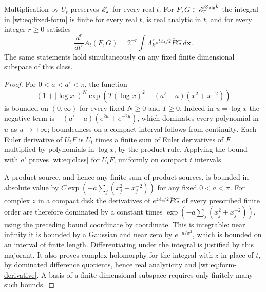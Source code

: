 \begin{lemma}
\label{wt:lem:domination}
Multiplication by $U_t$ preserves $\mathscr E_\pi$ for every real $t$.
For $F,G\in\mathscr E_\pi^{\otimes_{\mathrm{alg}} k}$ the integral
in \eqref{wt:eq:fixed-form} is finite for every real $t$, is
real analytic in $t$, and for every integer $r\geq0$ satisfies
\begin{equation}\label{wt:eq:form-derivative}
 \frac{d^r}{dt^r}A_t(F,G)
 =2^{-r}\int\Lambda_k^r e^{t\Lambda_k/2}\overline F G\,d\mathbf x.
\end{equation}
The same statements hold simultaneously on any fixed finite
dimensional subspace of this class.
\end{lemma}

\begin{proof}
For $0<a<a'<\pi$, the function
\[
 (1+|\log x|)^N
 \exp\!\left(T(\log x)^2-(a'-a)(x^2+x^{-2})\right)
\]
is bounded on $(0,\infty)$ for every fixed $N\geq0$ and $T\geq0$.
Indeed in $u=\log x$ the negative term is
$-(a'-a)(e^{2u}+e^{-2u})$, which dominates every polynomial
in $u$ as $u\to\pm\infty$; boundedness on a compact interval
follows from continuity.  Each Euler derivative of $U_tF$ is
$U_t$ times a finite sum of Euler derivatives of $F$ multiplied
by polynomials in $\log x$, by the product rule.  Applying the
bound with $a'$ proves \eqref{wt:eq:class} for $U_tF$, uniformly
on compact $t$ intervals.

A product source, and hence any finite sum of product sources,
is bounded in absolute value by
$C\exp(-a\sum_j(x_j^2+x_j^{-2}))$ for any fixed $0<a<\pi$.
For complex $z$ in a compact disk the derivatives of
$e^{z\Lambda_k/2}\overline F G$ of every prescribed finite
order are therefore dominated by a constant times
$\exp(-a\sum_j(x_j^2+x_j^{-2}))$, using the preceding bound
coordinate by coordinate.  This is integrable: near infinity
it is bounded by a Gaussian and near zero by $e^{-a/x^2}$,
which is bounded on an interval of finite length.  Differentiating
under the integral is justified by this majorant.  It also proves
complex holomorphy for the integral with $z$ in place of $t$,
by dominated difference quotients, hence real analyticity and
\eqref{wt:eq:form-derivative}.  A basis of a finite dimensional
subspace requires only finitely many such bounds.
\end{proof}

